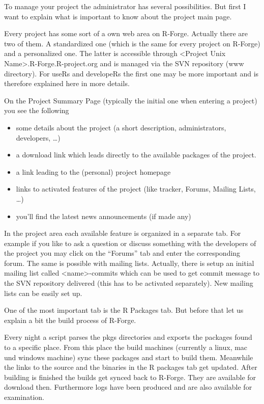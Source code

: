 To manage your project the administrator has several
possibilities. But first I want to explain what is important to know
about the project main page.

Every project has some sort of a own web area on R-Forge. Actually
there are two of them. A standardized one (which is the same for every
project on R-Forge) and a personalized one. The latter is accessible
through <Project Unix Name>.R-Forge.R-project.org and is managed via
the SVN repository (www directory). For useRs and developeRs the first
one may be more important and is therefore explained here in more
details.

On the Project Summary Page (typically the initial one when entering a
project) you see the following

\begin{itemize}
\item some details about the project (a short description,
  administrators, developers, \ldots{})

\item a download link which leads directly to the available packages
  of the project.
\item a link leading to the (personal) project homepage

\item links to activated features of the project (like tracker,
  Forums, Mailing Lists, \ldots{})

\item you'll find the latest news announcements (if made any)

\end{itemize}

In the project area each available feature is organized in a separate
tab. For example if you like to ask a question or discuss something
with the developers of the project you may click on the ``Forums'' tab
and enter the corresponding forum. The same is possible with mailing
lists. Actually, there is setup an initial mailing list called
<name>-commits which can be used to get commit message to the SVN
repository delivered (this has to be activated separately). New
mailing lists can be easily set up.

One of the most important tab is the R Packages tab. But before that
let us explain a bit the build process of R-Forge.

Every night a script parses the pkgs directories and exports the
packages found to a specific place. From this place the build machines
(currently a linux, mac und windows machine) sync these packages and
start to build them. Meanwhile the links to the source and the
binaries in the R packages tab get updated. After building is finished
the builds get synced back to R-Forge. They are available for download
then. Furthermore logs have been produced and are also available for
examination.


